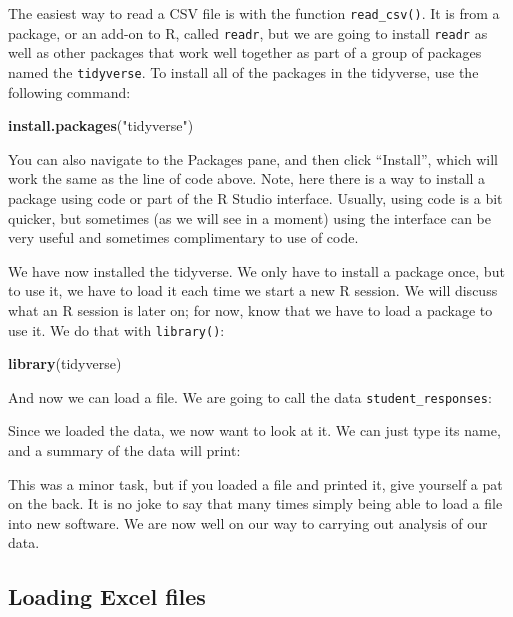 \documentclass[]{book}
\newenvironment{Shaded}{\begin{snugshade}}{\end{snugshade}}
\newcommand{\KeywordTok}[1]{\textcolor[rgb]{0.13,0.29,0.53}{\textbf{#1}}}
\newcommand{\StringTok}[1]{\textcolor[rgb]{0.31,0.60,0.02}{#1}}
\newcommand{\NormalTok}[1]{#1}
\theoremstyle{definition}
\theoremstyle{definition}
\theoremstyle{remark}
\begin{document}
The easiest way to read a CSV file is with the function
\texttt{read\_csv()}. It is from a package, or an add-on to R, called
\texttt{readr}, but we are going to install \texttt{readr} as well as
other packages that work well together as part of a group of packages
named the \texttt{tidyverse}. To install all of the packages in the
tidyverse, use the following command:

\begin{Shaded}
\begin{Highlighting}[]
\KeywordTok{install.packages}\NormalTok{(}\StringTok{"tidyverse"}\NormalTok{)}
\end{Highlighting}
\end{Shaded}

You can also navigate to the Packages pane, and then click ``Install'',
which will work the same as the line of code above. Note, here there is
a way to install a package using code or part of the R Studio interface.
Usually, using code is a bit quicker, but sometimes (as we will see in a
moment) using the interface can be very useful and sometimes
complimentary to use of code.

We have now installed the tidyverse. We only have to install a package
once, but to use it, we have to load it each time we start a new R
session. We will discuss what an R session is later on; for now, know
that we have to load a package to use it. We do that with
\texttt{library()}:

\begin{Shaded}
\begin{Highlighting}[]
\KeywordTok{library}\NormalTok{(tidyverse)}
\end{Highlighting}
\end{Shaded}

And now we can load a file. We are going to call the data
\texttt{student\_responses}:

Since we loaded the data, we now want to look at it. We can just type
its name, and a summary of the data will print:

This was a minor task, but if you loaded a file and printed it, give
yourself a pat on the back. It is no joke to say that many times simply
being able to load a file into new software. We are now well on our way
to carrying out analysis of our data.

\subsection{Loading Excel files}\label{loading-excel-files}
\end{document}
